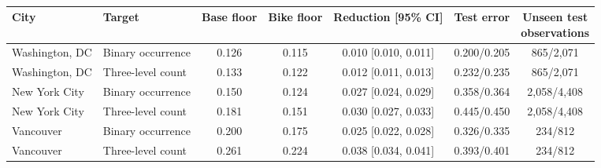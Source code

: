 \begin{table}[!htbp]
\caption{}
\label{tab:e14_fano_results}
\centering
\small
\setlength{\tabcolsep}{2.5pt}
\begin{tabular*}{\textwidth}{@{\extracolsep{\fill}}llccccc@{}}
\toprule
\textbf{City} & \textbf{Target} & \textbf{Base floor} & \textbf{Bike floor} & \textbf{Reduction [95\% CI]} & \textbf{Test error} & \shortstack{\textbf{Unseen test}\\\textbf{observations}}\\
\midrule
Washington, DC & Binary occurrence & 0.126 & 0.115 & 0.010 [0.010, 0.011] & 0.200/0.205 & 865/2,071\\
Washington, DC & Three-level count & 0.133 & 0.122 & 0.012 [0.011, 0.013] & 0.232/0.235 & 865/2,071\\
New York City & Binary occurrence & 0.150 & 0.124 & 0.027 [0.024, 0.029] & 0.358/0.364 & 2,058/4,408\\
New York City & Three-level count & 0.181 & 0.151 & 0.030 [0.027, 0.033] & 0.445/0.450 & 2,058/4,408\\
Vancouver & Binary occurrence & 0.200 & 0.175 & 0.025 [0.022, 0.028] & 0.326/0.335 & 234/812\\
Vancouver & Three-level count & 0.261 & 0.224 & 0.038 [0.034, 0.041] & 0.393/0.401 & 234/812\\
\bottomrule
\end{tabular*}
\end{table}
